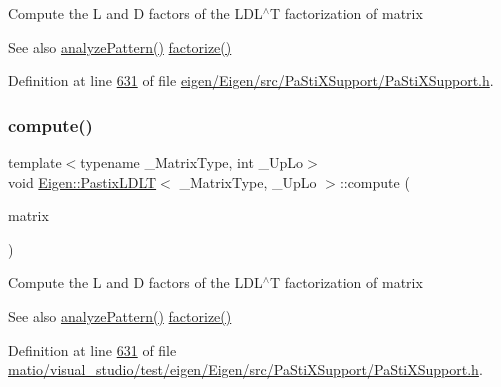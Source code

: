 Compute the L and D factors of the L\+D\+L$^\wedge$T factorization of {\ttfamily matrix} \begin{DoxySeeAlso}{See also}
\hyperlink{class_eigen_1_1_pastix_l_d_l_t_a01947862303ca404b9ce5033751a221b}{analyze\+Pattern()} \hyperlink{class_eigen_1_1_pastix_l_d_l_t_a182b0ee676a131413363cc73bc309ef7}{factorize()} 
\end{DoxySeeAlso}


Definition at line \hyperlink{eigen_2_eigen_2src_2_pa_sti_x_support_2_pa_sti_x_support_8h_source_l00631}{631} of file \hyperlink{eigen_2_eigen_2src_2_pa_sti_x_support_2_pa_sti_x_support_8h_source}{eigen/\+Eigen/src/\+Pa\+Sti\+X\+Support/\+Pa\+Sti\+X\+Support.\+h}.

\mbox{\label{class_eigen_1_1_pastix_l_d_l_t_abf3135c2dc17d9df26fef80e6456a691}} 
\subsubsection{\texorpdfstring{compute()}{compute()}\hspace{0.1cm}{\footnotesize\ttfamily [2/2]}}
{\footnotesize\ttfamily template$<$typename \+\_\+\+Matrix\+Type, int \+\_\+\+Up\+Lo$>$ \\
void \hyperlink{class_eigen_1_1_pastix_l_d_l_t}{Eigen\+::\+Pastix\+L\+D\+LT}$<$ \+\_\+\+Matrix\+Type, \+\_\+\+Up\+Lo $>$\+::compute (\begin{DoxyParamCaption}\item[{const Matrix\+Type \&}]{matrix }\end{DoxyParamCaption})\hspace{0.3cm}{\ttfamily [inline]}}

Compute the L and D factors of the L\+D\+L$^\wedge$T factorization of {\ttfamily matrix} \begin{DoxySeeAlso}{See also}
\hyperlink{class_eigen_1_1_pastix_l_d_l_t_a01947862303ca404b9ce5033751a221b}{analyze\+Pattern()} \hyperlink{class_eigen_1_1_pastix_l_d_l_t_a182b0ee676a131413363cc73bc309ef7}{factorize()} 
\end{DoxySeeAlso}


Definition at line \hyperlink{matio_2visual__studio_2test_2eigen_2_eigen_2src_2_pa_sti_x_support_2_pa_sti_x_support_8h_source_l00631}{631} of file \hyperlink{matio_2visual__studio_2test_2eigen_2_eigen_2src_2_pa_sti_x_support_2_pa_sti_x_support_8h_source}{matio/visual\+\_\+studio/test/eigen/\+Eigen/src/\+Pa\+Sti\+X\+Support/\+Pa\+Sti\+X\+Support.\+h}.

